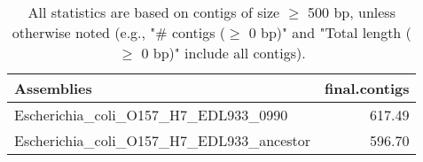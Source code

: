 \documentclass[12pt,a4paper]{article}
\begin{document}
\begin{table}[ht]
\begin{center}
\caption{All statistics are based on contigs of size $\geq$ 500 bp, unless otherwise noted (e.g., "\# contigs ($\geq$ 0 bp)" and "Total length ($\geq$ 0 bp)" include all contigs).}
\begin{tabular}{|l*{1}{|r}|}
\hline
Assemblies & final.contigs \\ \hline
Escherichia\_coli\_O157\_H7\_EDL933\_0990 & 617.49 \\ \hline
Escherichia\_coli\_O157\_H7\_EDL933\_ancestor & 596.70 \\ \hline
\end{tabular}
\end{center}
\end{table}
\end{document}
